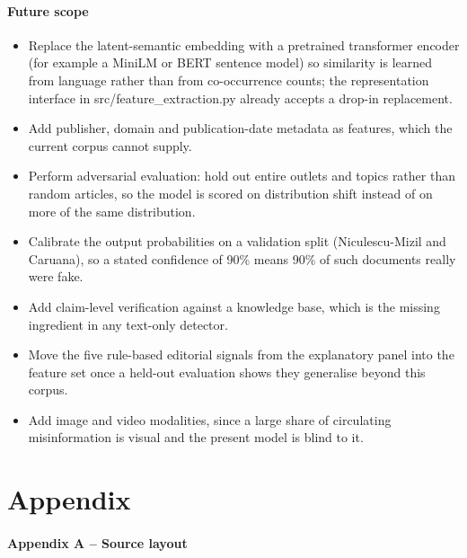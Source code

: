 \documentclass[conference,a4paper]{IEEEtran}
\begin{document}
\paragraph{Future scope}

\begin{itemize}
  \item Replace the latent-semantic embedding with a pretrained transformer encoder (for example a MiniLM or BERT sentence model) so similarity is learned from language rather than from co-occurrence counts; the representation interface in src/feature\_extraction.py already accepts a drop-in replacement.
  \item Add publisher, domain and publication-date metadata as features, which the current corpus cannot supply.
  \item Perform adversarial evaluation: hold out entire outlets and topics rather than random articles, so the model is scored on distribution shift instead of on more of the same distribution.
  \item Calibrate the output probabilities on a validation split (Niculescu-Mizil and Caruana), so a stated confidence of 90\% means 90\% of such documents really were fake.
  \item Add claim-level verification against a knowledge base, which is the missing ingredient in any text-only detector.
  \item Move the five rule-based editorial signals from the explanatory panel into the feature set once a held-out evaluation shows they generalise beyond this corpus.
  \item Add image and video modalities, since a large share of circulating misinformation is visual and the present model is blind to it.
\end{itemize}

\section{Appendix}

\paragraph{Appendix A -- Source layout}
\end{document}
